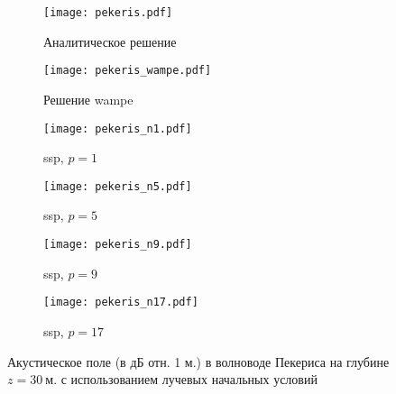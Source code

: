 \documentclass[../document.tex]{subfiles}
\begin{document}
                \begin{figure}[h]
                    \centering
                    \begin{subfigure}[t]{0.49\textwidth}
                        \centering
                        \texttt{[image: pekeris.pdf]}
                        \caption{Аналитическое решение}
                    \end{subfigure}
                    \begin{subfigure}[t]{0.49\textwidth}
                        \centering
                        \texttt{[image: pekeris\_wampe.pdf]}
                        \caption{Решение \acrshort{wampe}}
                    \end{subfigure}
                    \hfill
                    \begin{subfigure}[t]{0.49\textwidth}
                        \centering
                        \texttt{[image: pekeris\_n1.pdf]}
                        \caption{\acrshort{ssp}, $p=1$}
                    \end{subfigure}
                    \begin{subfigure}[t]{0.49\textwidth}
                        \centering
                        \texttt{[image: pekeris\_n5.pdf]}
                        \caption{\acrshort{ssp}, $p=5$}
                    \end{subfigure}
                    \hfill
                    \begin{subfigure}[t]{0.49\textwidth}
                        \centering
                        \texttt{[image: pekeris\_n9.pdf]}
                        \caption{\acrshort{ssp}, $p=9$}
                    \end{subfigure}
                    \begin{subfigure}[t]{0.49\textwidth}
                        \centering
                        \texttt{[image: pekeris\_n17.pdf]}
                        \caption{\acrshort{ssp}, $p=17$}
                    \end{subfigure}
                    \caption{Акустическое поле (в дБ отн. 1 м.) в волноводе Пекериса на глубине $z=30\ \text{м.}$ с использованием лучевых начальных условий\label{fig::pekeris}}
                \end{figure}
\end{document}
